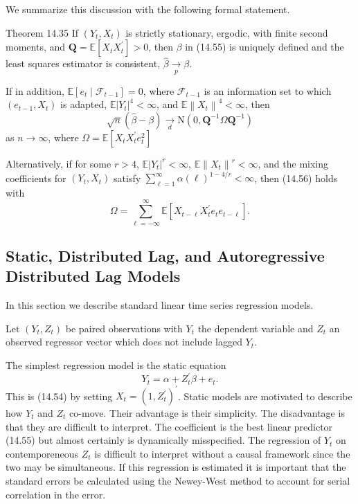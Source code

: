 \documentclass[10pt]{article}
\begin{document}
We summarize this discussion with the following formal statement.

Theorem 14.35 If $\left(Y_{t}, X_{t}\right)$ is strictly stationary, ergodic, with finite second moments, and $\boldsymbol{Q}=\mathbb{E}\left[X_{t} X_{t}^{\prime}\right]>0$, then $\beta$ in (14.55) is uniquely defined and the least squares estimator is consistent, $\widehat{\beta} \underset{p}{\longrightarrow} \beta$.

If in addition, $\mathbb{E}\left[e_{t} \mid \mathscr{F}_{t-1}\right]=0$, where $\mathscr{F}_{t-1}$ is an information set to which $\left(e_{t-1}, X_{t}\right)$ is adapted, $\mathbb{E}\left|Y_{t}\right|^{4}<\infty$, and $\mathbb{E}\left\|X_{t}\right\|^{4}<\infty$, then
$$
\sqrt{n}(\widehat{\beta}-\beta) \underset{d}{\longrightarrow} \mathrm{N}\left(0, \boldsymbol{Q}^{-1} \Omega \boldsymbol{Q}^{-1}\right)
$$
as $n \rightarrow \infty$, where $\Omega=\mathbb{E}\left[X_{t} X_{t}^{\prime} e_{t}^{2}\right]$

Alternatively, if for some $r>4$, $\mathbb{E}\left|Y_{t}\right|^{r}<\infty$, $\mathbb{E}\left\|X_{t}\right\|^{r}<\infty$, and the mixing coefficients for $\left(Y_{t}, X_{t}\right)$ satisfy $\sum_{\ell=1}^{\infty} \alpha(\ell)^{1-4 / r}<\infty$, then (14.56) holds with
$$
\Omega=\sum_{\ell=-\infty}^{\infty} \mathbb{E}\left[X_{t-\ell} X_{t}^{\prime} e_{t} e_{t-\ell}\right] .
$$

\subsection{Static, Distributed Lag, and Autoregressive Distributed Lag Models}
In this section we describe standard linear time series regression models.

Let $\left(Y_{t}, Z_{t}\right)$ be paired observations with $Y_{t}$ the dependent variable and $Z_{t}$ an observed regressor vector which does not include lagged $Y_{t}$.

The simplest regression model is the static equation
$$
Y_{t}=\alpha+Z_{t}^{\prime} \beta+e_{t} .
$$
This is (14.54) by setting $X_{t}=\left(1, Z_{t}^{\prime}\right)^{\prime}$. Static models are motivated to describe how $Y_{t}$ and $Z_{t}$ co-move. Their advantage is their simplicity. The disadvantage is that they are difficult to interpret. The coefficient is the best linear predictor (14.55) but almost certainly is dynamically misspecified. The regression of $Y_{t}$ on contemporeneous $Z_{t}$ is difficult to interpret without a causal framework since the two may be simultaneous. If this regression is estimated it is important that the standard errors be calculated using the Newey-West method to account for serial correlation in the error.
\end{document}
